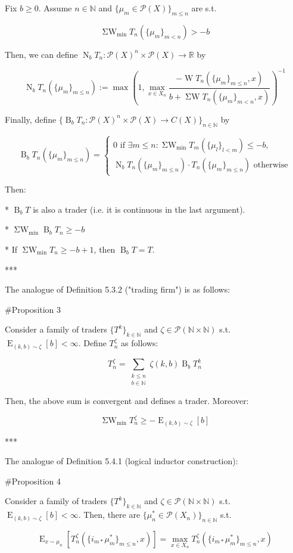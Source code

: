\documentclass[a4paper]{article}
\DeclareMathOperator{\E}{E}
\newcommand{\Nats}{\mathbb{N}}
\newcommand{\Reals}{\mathbb{R}}
\newcommand{\Prob}{\mathcal{P}}
\newcommand{\B}{\operatorname{B}_b}
\newcommand{\N}{\operatorname{N}_b}
\newcommand{\W}{\operatorname{W}}
\newcommand{\SW}{\operatorname{\Sigma W}}
\newcommand{\SWm}{\operatorname{\Sigma W}_{\min}}
\begin{document}
Fix ${b \geq 0}$. Assume ${n \in \Nats}$ and $\{\mu_m \in \Prob(X)\}_{m \leq n}$ are s.t. 

$$\SWm T_n(\{\mu_m\}_{m < n}) > -b$$

Then, we can define ${\N T_n: \Prob(X)^n \times \Prob(X) \rightarrow \Reals}$ by

$$\N T_n(\{\mu_m\}_{m \leq n}) :=\max(1,\max_{x \in X_n} \frac{-\W T_n(\{\mu_m\}_{m \leq n}, x)}{b + \SW T_n(\{\mu_m\}_{m < n},x)})^{-1}$$

Finally, define ${\{\B T_n: \Prob(X)^n \times \Prob(X) \rightarrow C(X)\}_{n \in \Nats}}$ by

$$\B T_n(\{\mu_m\}_{m \leq n})=\begin{cases}0 \text{ if } \exists m \leq n: \SWm T_m(\{\mu_l\}_{l < m}) \leq -b, \\ \N T_n(\{\mu_m\}_{m \leq n}) \cdot T_n(\{\mu_m\}_{m \leq n}) \text{ otherwise} \end{cases}$$

Then:

* ${\B T}$ is also a trader (i.e. it is continuous in the last argument).

* $\SWm\B T_n \geq -b$

* If $\SWm T_n \geq -b+1$, then ${\B T = T}$.

***

The analogue of Definition 5.3.2 ("trading firm") is as follows:

\#Proposition 3

Consider a family of traders $\{T^k\}_{k \in \Nats}$ and ${\zeta \in \Prob(\Nats \times \Nats)}$ s.t. ${\E_{(k,b) \sim \zeta}[b] < \infty}$. Define ${T^\zeta_n}$ as follows:

$$T^\zeta_n = \sum_{\substack{k \leq n\\b \in \Nats}} \zeta(k,b) \B T^k_n$$

Then, the above sum is convergent and defines a trader. Moreover:

$$\SWm T^\zeta_n \geq -\E_{(k,b) \sim \zeta}[b]$$

***

The analogue of Definition 5.4.1 (logical inductor construction):

\#Proposition 4

Consider a family of traders $\{T^k\}_{k \in \Nats}$ and ${\zeta \in \Prob(\Nats \times \Nats)}$ s.t. ${\E_{(k,b) \sim \zeta}[b] < \infty}$. Then, there are ${\{\mu^*_n \in \Prob(X_n)\}_{n \in \Nats}}$ s.t.

$$\E_{x \sim \mu_n}[T^\zeta_n(\{i_{m*}\mu^*_m\}_{m \leq n},x)] = \max_{x \in X_n} T^\zeta_n(\{i_{m*}\mu^*_m\}_{m \leq n},x)$$
\end{document}
